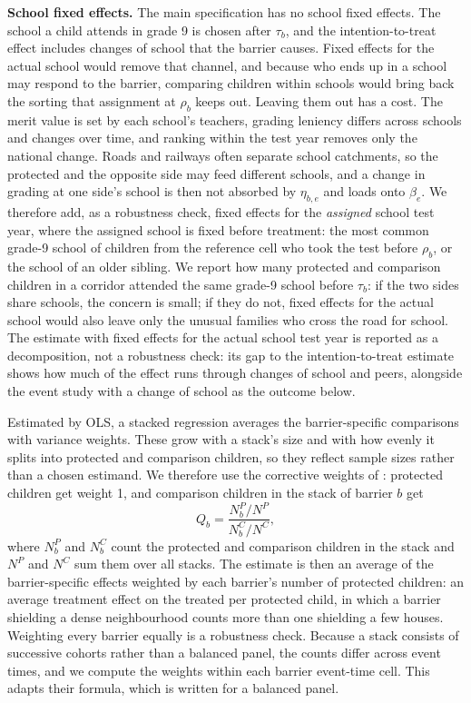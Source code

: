 \documentclass[11pt]{article}
\begin{document}
\textbf{School fixed effects.} The main specification has no school fixed effects. The school a child attends in grade 9 is chosen after \(\tau_b\), and the intention-to-treat effect includes changes of school that the barrier causes. Fixed effects for the actual school would remove that channel, and because who ends up in a school may respond to the barrier, comparing children within schools would bring back the sorting that assignment at \(\rho_b\) keeps out. Leaving them out has a cost. The merit value is set by each school's teachers, grading leniency differs across schools and changes over time, and ranking within the test year removes only the national change. Roads and railways often separate school catchments, so the protected and the opposite side may feed different schools, and a change in grading at one side's school is then not absorbed by \(\eta_{b,e}\) and loads onto \(\beta_e\). We therefore add, as a robustness check, fixed effects for the \emph{assigned} school \texttimes{} test year, where the assigned school is fixed before treatment: the most common grade-9 school of children from the reference cell who took the test before \(\rho_b\), or the school of an older sibling. We report how many protected and comparison children in a corridor attended the same grade-9 school before \(\tau_b\): if the two sides share schools, the concern is small; if they do not, fixed effects for the actual school would also leave only the unusual families who cross the road for school. The estimate with fixed effects for the actual school \texttimes{} test year is reported as a decomposition, not a robustness check: its gap to the intention-to-treat estimate shows how much of the effect runs through changes of school and peers, alongside the event study with a change of school as the outcome below.

Estimated by OLS, a stacked regression averages the barrier-specific comparisons with variance weights. These grow with a stack's size and with how evenly it splits into protected and comparison children, so they reflect sample sizes rather than a chosen estimand. We therefore use the corrective weights of \textcite{wingStackedDifferenceinDifferences2024}: protected children get weight 1, and comparison children in the stack of barrier \(b\) get
\[
Q_b = \frac{N^P_b / N^P}{N^C_b / N^C},
\]
where \(N^P_b\) and \(N^C_b\) count the protected and comparison children in the stack and \(N^P\) and \(N^C\) sum them over all stacks. The estimate is then an average of the barrier-specific effects weighted by each barrier's number of protected children: an average treatment effect on the treated per protected child, in which a barrier shielding a dense neighbourhood counts more than one shielding a few houses. Weighting every barrier equally is a robustness check. Because a stack consists of successive cohorts rather than a balanced panel, the counts differ across event times, and we compute the weights within each barrier \texttimes{} event-time cell. This adapts their formula, which is written for a balanced panel.
\end{document}
